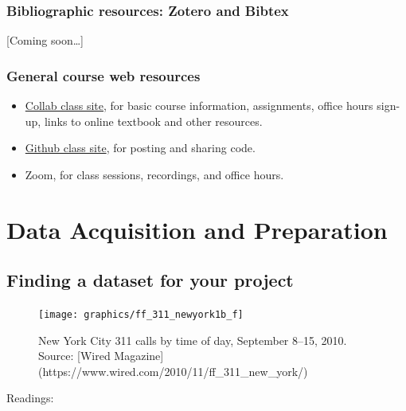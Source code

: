 \documentclass[
]{book}
\providecommand{\tightlist}{%
  \setlength{\itemsep}{0pt}\setlength{\parskip}{0pt}}
\begin{document}
\hypertarget{bibliographic-resources-zotero-and-bibtex}{%
\section{Bibliographic resources: Zotero and Bibtex}\label{bibliographic-resources-zotero-and-bibtex}}

{[}Coming soon\ldots{]}

\hypertarget{general-course-web-resources}{%
\section{General course web resources}\label{general-course-web-resources}}

\begin{itemize}
\tightlist
\item
  \href{https://collab.its.virginia.edu}{Collab class site}, for basic course information, assignments, office hours sign-up, links to online textbook and other resources.
\item
  \href{https://github.com/uva-eng-time-series-sp21}{Github class site}, for posting and sharing code.
\item
  Zoom, for class sessions, recordings, and office hours.
\end{itemize}

\hypertarget{part-data-acquisition-and-preparation}{%
\part{Data Acquisition and Preparation}\label{part-data-acquisition-and-preparation}}

\hypertarget{finding-a-dataset-for-your-project}{%
\chapter{Finding a dataset for your project}\label{finding-a-dataset-for-your-project}}

\begin{figure}

{\centering \texttt{[image: graphics/ff\_311\_newyork1b\_f]} 

}

\caption{New York City 311 calls by time of day, September 8--15, 2010. Source: [Wired Magazine](https://www.wired.com/2010/11/ff_311_new_york/)}\label{fig:unnamed-chunk-9}
\end{figure}

Readings:
\end{document}
